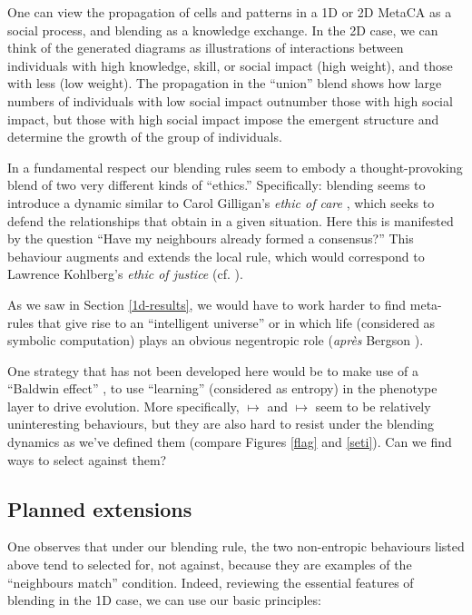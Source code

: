 \documentclass{AISB2008}
\makeatletter
\renewcommand{\boxed}[1]{\text{\fboxsep=.2em\fbox{\m@th$\displaystyle#1$}}}
\newcommand{\mystrut}{\vphantom{b\gamma}}
\makeatother
\begin{document}
One can view the propagation of cells and patterns in a 1D or 2D
MetaCA as a social process, and blending as a knowledge exchange.  In
the 2D case, we can think of the generated diagrams as illustrations
of interactions between individuals with high knowledge, skill, or
social impact (high weight), and those with less (low weight).  The
propagation in the ``union'' blend shows how large numbers of
individuals with low social impact outnumber those with high social
impact, but those with high social impact impose the emergent
structure and determine the growth of the group of individuals.

In a fundamental respect our blending rules seem to embody a
thought-provoking blend of two very different kinds of ``ethics.''
Specifically: blending seems to introduce a dynamic similar to Carol
Gilligan's \emph{ethic of care} \cite{gilligan1982different}, which
seeks to defend the relationships that obtain in a given situation.
Here this is manifested by the question ``Have my neighbours already
formed a consensus?''  This behaviour augments and extends the local
rule, which would correspond to Lawrence Kohlberg’s \emph{ethic of
  justice} (cf. \cite{benhabib1985generalized}).

As we saw in Section \ref{1d-results}, we would have to work harder to
find meta-rules that give rise to an ``intelligent universe'' or in
which life (considered as symbolic computation) plays an obvious
negentropic role (\emph{apr\`es} Bergson \cite{bergson1912creative}).

One strategy that has not been developed here would be to make use of
a ``Baldwin effect'' \cite{baldwin-effect,weber2003evolution}, to use
``learning'' (considered as entropy) in the phenotype layer to drive
evolution.  More specifically,
\boxed{0\mystrut}\boxed{0\mystrut}\boxed{0\mystrut} $\mapsto$
\boxed{0\mystrut} and
\boxed{1\mystrut}\boxed{1\mystrut}\boxed{1\mystrut} $\mapsto$
\boxed{1\mystrut} seem to be relatively uninteresting behaviours, but
they are also hard to resist under the blending dynamics as we've
defined them (compare Figures \ref{flag} and \ref{seti}).  Can we find
ways to select against them?

\subsection{Planned extensions}

One observes that under our blending rule, the two non-entropic
behaviours listed above tend to selected for, not against, because
they are examples of the ``neighbours match'' condition.  Indeed,
reviewing the essential features of blending in the 1D case, we can
use our basic principles:
\end{document}
